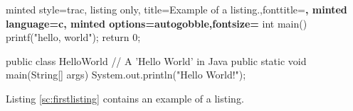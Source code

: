 \documentclass{book}
\begin{document}
\listoflistings
\begin{tcblisting}{minted style=trac, listing only,
        title=Example of a listing.,fonttitle=\bfseries,
        minted language=c,
        minted options={autogobble,fontsize=\small}
    }
    int main() {
        printf("hello, world");
        return 0;
    }
\end{tcblisting}

\begin{myjava}
    public class HelloWorld {
        // A 'Hello World' in Java
        public static void main(String[] args) {
            System.out.println("Hello World!");
        }
    }
\end{myjava}

Listing \ref{sc:firstlisting} contains an example of a listing.
\end{document}
